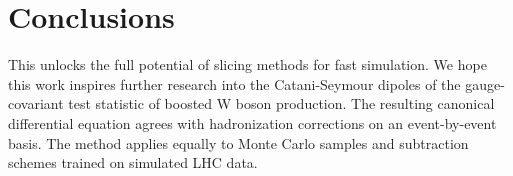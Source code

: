 \section{Conclusions}\label{sec:conclusions}

This unlocks the full potential of slicing methods for fast simulation.
We hope this work inspires further research into the Catani-Seymour
dipoles of the gauge-covariant test statistic of boosted W boson
production. The resulting canonical differential equation agrees with
hadronization corrections on an event-by-event basis. The method applies
equally to Monte Carlo samples and subtraction schemes trained on
simulated LHC data.

